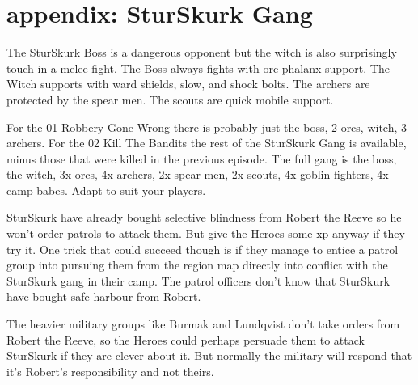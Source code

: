 \newpage
\section*{appendix: SturSkurk Gang}

\raggedbottom

The SturSkurk Boss is a dangerous opponent but the witch is also surprisingly touch in a melee fight. The Boss always fights with orc phalanx support. The Witch supports with ward shields, slow, and shock bolts. The archers are protected by the spear men. The scouts are quick mobile support.

For the 01 Robbery Gone Wrong there is probably just the boss, 2 orcs, witch, 3 archers. For the 02 Kill The Bandits the rest of the SturSkurk Gang is available, minus those that were killed in the previous episode. The full gang is the boss, the witch, 3x orcs, 4x archers, 2x spear men, 2x scouts, 4x goblin fighters, 4x camp babes. Adapt to suit your players.

SturSkurk have already bought selective blindness from Robert the Reeve so he won't order patrols to attack them. But give the Heroes some xp anyway if they try it. One trick that could succeed though is if they manage to entice a patrol group into pursuing them from the region map directly into conflict with the SturSkurk gang in their camp. The patrol officers don't know that SturSkurk have bought safe harbour from Robert.

The heavier military groups like Burmak and Lundqvist don't take orders from Robert the Reeve, so the Heroes could perhaps persuade them to attack SturSkurk if they are clever about it. But normally the military will respond that it's Robert's responsibility and not theirs.



